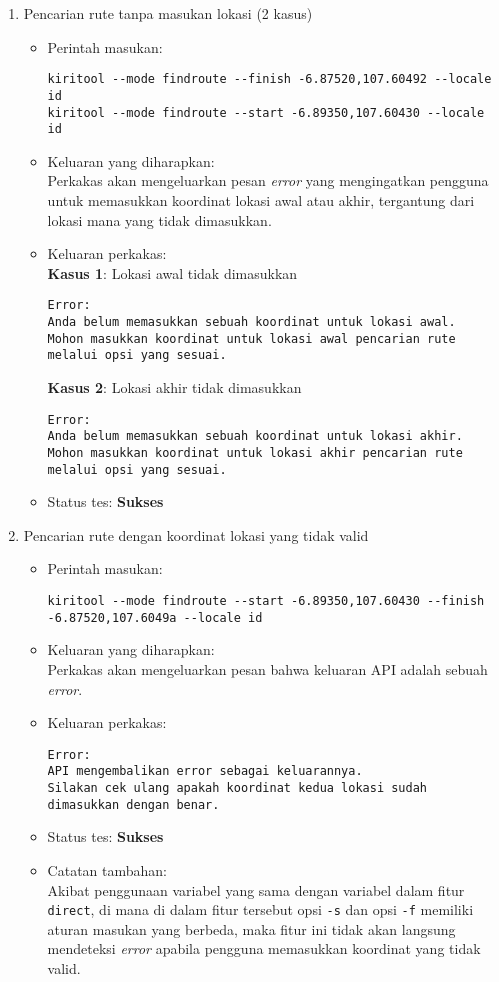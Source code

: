 \begin{enumerate}
	\item Pencarian rute tanpa masukan lokasi (2 kasus)
	\begin{itemize}
		\item Perintah masukan:
		\begin{lstlisting}
kiritool --mode findroute --finish -6.87520,107.60492 --locale id
kiritool --mode findroute --start -6.89350,107.60430 --locale id
		\end{lstlisting}
		\item Keluaran yang diharapkan: \\
		Perkakas akan mengeluarkan pesan \textit{error} yang mengingatkan pengguna untuk memasukkan koordinat \latlon lokasi awal atau akhir, tergantung dari lokasi mana yang tidak dimasukkan.
		\item Keluaran perkakas: \\
		\textbf{Kasus 1}: Lokasi awal tidak dimasukkan
		\begin{lstlisting}
Error:
Anda belum memasukkan sebuah koordinat untuk lokasi awal.
Mohon masukkan koordinat untuk lokasi awal pencarian rute melalui opsi yang sesuai.
		\end{lstlisting}
		\textbf{Kasus 2}: Lokasi akhir tidak dimasukkan
		\begin{lstlisting}
Error:
Anda belum memasukkan sebuah koordinat untuk lokasi akhir.
Mohon masukkan koordinat untuk lokasi akhir pencarian rute melalui opsi yang sesuai.
		\end{lstlisting}
		\item Status tes: \textbf{Sukses}
	\end{itemize}
	
	\item Pencarian rute dengan koordinat lokasi yang tidak valid
	\begin{itemize}
		\item Perintah masukan:
		\begin{lstlisting}
kiritool --mode findroute --start -6.89350,107.60430 --finish -6.87520,107.6049a --locale id
		\end{lstlisting}
		\item Keluaran yang diharapkan: \\
		Perkakas akan mengeluarkan pesan bahwa keluaran API adalah sebuah \textit{error}.
		\item Keluaran perkakas:
		\begin{lstlisting}
Error:
API mengembalikan error sebagai keluarannya.
Silakan cek ulang apakah koordinat kedua lokasi sudah dimasukkan dengan benar.
		\end{lstlisting}
		\item Status tes: \textbf{Sukses}
		\item Catatan tambahan: \\
		Akibat penggunaan variabel yang sama dengan variabel dalam fitur \verb|direct|, di mana di dalam fitur tersebut opsi \verb|-s| dan opsi \verb|-f| memiliki aturan masukan yang berbeda, maka fitur ini tidak akan langsung mendeteksi \textit{error} apabila pengguna memasukkan koordinat yang tidak valid.
	\end{itemize}
	

\end{enumerate}
